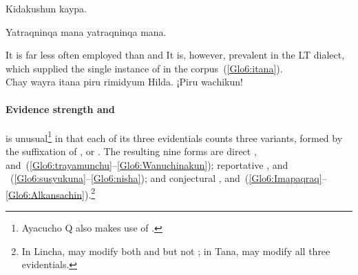 %
{Kidakushun kaypa.}%
{}%
{}{}%

%
{Yatraqninqa mana yatraqninqa mana.}%
{}%
{}{}%

\noindent
It is far less often employed than  and  It is, however, prevalent in the LT dialect\phono, which supplied the single instance of  in the corpus~(\ref{Glo6:itana}).\\

%
{Chay wayra itana piru rimidyum Hilda. ¡Piru wachikun!}%
{}%
{}{}%

\paragraph{Evidence strength  and }\label{par:evistre}
\SYQ{} is unusual\footnote{Ayacucho Q also makes use of .} in that each of its three evidentials counts three variants, formed by the suffixation of \phono{-\uo},  or . The resulting nine forms are direct ,  and~(\ref{Glo6:trayamunchu}--\ref{Glo6:Wanuchinakun}); reportative ,  and ~(\ref{Glo6:susyukuna}--\ref{Glo6:nisha}); and conjectural ,  and~(\ref{Glo6:Imapaqraq}--\ref{Glo6:Alkansachin}).\footnote{In Lincha,  may modify both  and  but not ; in Tana,  may modify all three evidentials.}\\

